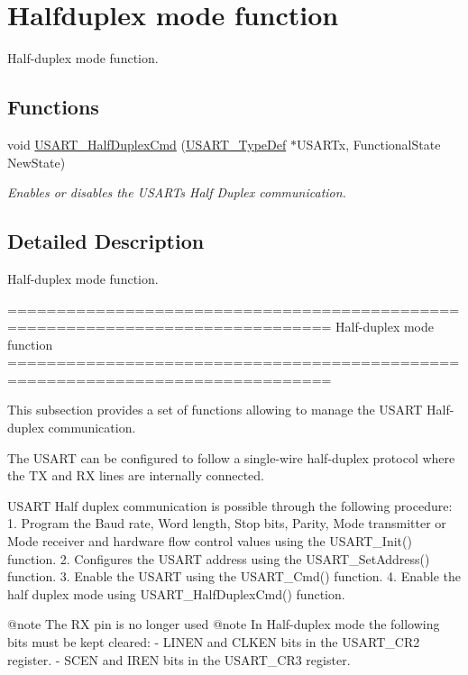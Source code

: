 \hypertarget{group___u_s_a_r_t___group5}{}\section{Halfduplex mode function}
\label{group___u_s_a_r_t___group5}


Half-\/duplex mode function.  


\subsection*{Functions}
\begin{DoxyCompactItemize}
\item 
void \hyperlink{group___u_s_a_r_t___group5_gaaa23b05fe0e1896bad90da7f82750831}{U\+S\+A\+R\+T\+\_\+\+Half\+Duplex\+Cmd} (\hyperlink{struct_u_s_a_r_t___type_def}{U\+S\+A\+R\+T\+\_\+\+Type\+Def} $\ast$U\+S\+A\+R\+Tx, Functional\+State New\+State)
\begin{DoxyCompactList}\small\item\em Enables or disables the U\+S\+A\+RT\textquotesingle{}s Half Duplex communication. \end{DoxyCompactList}\end{DoxyCompactItemize}


\subsection{Detailed Description}
Half-\/duplex mode function. 

\begin{DoxyVerb} ===============================================================================
                         Half-duplex mode function
 ===============================================================================  

  This subsection provides a set of functions allowing to manage the USART 
  Half-duplex communication.
  
  The USART can be configured to follow a single-wire half-duplex protocol where 
  the TX and RX lines are internally connected.

  USART Half duplex communication is possible through the following procedure:
     1. Program the Baud rate, Word length, Stop bits, Parity, Mode transmitter 
        or Mode receiver and hardware flow control values using the USART_Init()
        function.
     2. Configures the USART address using the USART_SetAddress() function.
     3. Enable the USART using the USART_Cmd() function.
     4. Enable the half duplex mode using USART_HalfDuplexCmd() function.


@note The RX pin is no longer used
@note In Half-duplex mode the following bits must be kept cleared:
        - LINEN and CLKEN bits in the USART_CR2 register.
        - SCEN and IREN bits in the USART_CR3 register.\end{DoxyVerb}
 

